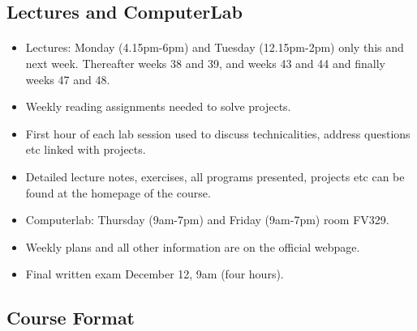 \documentclass[%
oneside,                 %
final,                   %
10pt]{article}
\begin{document}
\noindent



\subsection{Lectures and ComputerLab}


\paragraph{}
\begin{itemize}
  \item Lectures: Monday (4.15pm-6pm) and Tuesday (12.15pm-2pm) only this and next week. Thereafter weeks 38 and 39, and weeks 43 and 44 and finally weeks 47 and 48.

  \item Weekly reading assignments needed to solve projects.

  \item First hour of each lab session used to discuss technicalities, address questions etc linked with projects.

  \item Detailed lecture notes, exercises, all programs presented, projects etc can be found at the homepage of the course.

  \item Computerlab: Thursday (9am-7pm) and Friday (9am-7pm) room FV329.

  \item Weekly plans and all other information are on the official webpage.

  \item Final written exam December 12, 9am (four hours).
\end{itemize}

\noindent



\subsection{Course Format}


\end{document}
